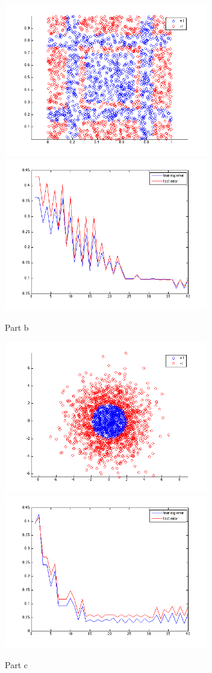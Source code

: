 \documentclass[11pt]{article}
\begin{document}
\begin{itemize}
		\begin{figure}[h]
			\centering
			\includegraphics[width=3.5in]{part_b_scatter.png}
			\includegraphics[width=3.5in]{part_b.png}
			\caption{Part b}
		\end{figure}
		
		\begin{figure}[h]
			\centering
			\includegraphics[width=3.5in]{part_c_scatter.png}
			\includegraphics[width=3.5in]{part_c.png}
			\caption{Part c}
		\end{figure}
		

\end{itemize}
\end{document}
